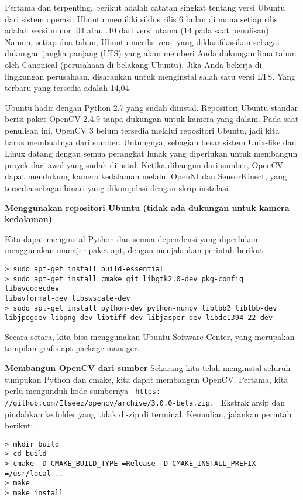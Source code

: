 \begin{enumerate}
\begin{enumerate}
Pertama dan terpenting, berikut adalah catatan singkat tentang versi Ubuntu dari sistem operasi: Ubuntu memiliki siklus rilis 6 bulan di mana setiap rilis adalah versi minor .04 atau .10 dari versi utama (14 pada saat penulisan). Namun, setiap dua tahun, Ubuntu merilis versi yang diklasifikasikan sebagai dukungan jangka panjang (LTS) yang akan memberi Anda dukungan lima tahun oleh Canonical (perusahaan di belakang Ubuntu). Jika Anda bekerja di lingkungan perusahaan, disarankan untuk menginstal salah satu versi LTS. Yang terbaru yang tersedia adalah 14,04.


Ubuntu hadir dengan Python 2.7 yang sudah diinstal. Repositori Ubuntu standar berisi paket OpenCV 2.4.9 tanpa dukungan untuk kamera yang dalam. Pada saat penulisan ini, OpenCV 3 belum tersedia melalui repositori Ubuntu, jadi kita harus membuatnya dari sumber. Untungnya, sebagian besar sistem Unix-like dan Linux datang dengan semua perangkat lunak yang diperlukan untuk membangun proyek dari awal yang sudah diinstal. Ketika dibangun dari sumber, OpenCV dapat mendukung kamera kedalaman melalui OpenNI dan SensorKinect, yang tersedia sebagai binari yang dikompilasi dengan skrip instalasi.

\par
\textbf {Menggunakan repositori Ubuntu (tidak ada dukungan untuk kamera kedalaman)}

Kita dapat menginstal Python dan semua dependensi yang diperlukan menggunakan manajer paket apt, dengan menjalankan perintah berikut:
\begin{verbatim}
> sudo apt-get install build-essential
> sudo apt-get install cmake git libgtk2.0-dev pkg-config libavcodecdev
libavformat-dev libswscale-dev
> sudo apt-get install python-dev python-numpy libtbb2 libtbb-dev libjpegdev libpng-dev libtiff-dev libjasper-dev libdc1394-22-dev 
\end{verbatim}
Secara setara, kita bisa menggunakan Ubuntu Software Center, yang merupakan tampilan grafis apt package manager.

\newpage
\textbf {Membangun OpenCV dari sumber}
Sekarang kita telah menginstal seluruh tumpukan Python dan cmake, kita dapat membangun OpenCV.
Pertama, kita perlu mengunduh kode sumbernya
\verb| https: //github.com/Itseez/opencv/archive/3.0.0-beta.zip. |
Ekstrak arsip dan pindahkan ke folder yang tidak di-zip di terminal.
Kemudian, jalankan perintah berikut:
\begin{verbatim}
> mkdir build
> cd build
> cmake -D CMAKE_BUILD_TYPE =Release -D CMAKE_INSTALL_PREFIX =/usr/local ..
> make
> make install 
\end{verbatim}


\end{enumerate}
\end{enumerate}
